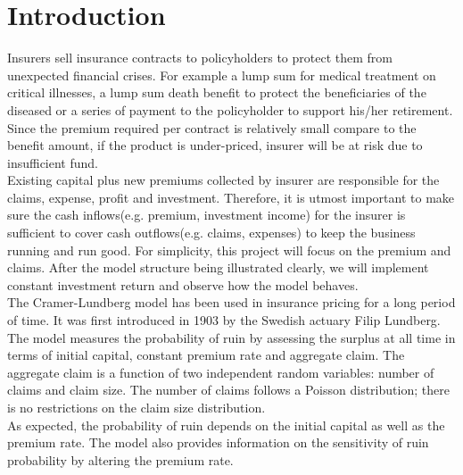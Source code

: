 \documentclass[12pt]{article}
\begin{document}
\newpage
\tableofcontents


\newpage
\section{Introduction}

\hspace{12.2mm}Insurers sell insurance contracts to policyholders to protect them from unexpected financial crises. For example a lump sum for medical treatment on critical illnesses, a lump sum death benefit to protect the beneficiaries of the diseased or a series of payment to the policyholder to support his/her retirement. Since the premium required per contract is relatively small compare to the benefit amount, if the product is under-priced, insurer will be at risk due to insufficient fund.\\

Existing capital plus new premiums collected by insurer are responsible for the claims, expense, profit and investment. Therefore, it is utmost important to make sure the cash inflows(e.g. premium, investment income) for the insurer is sufficient to cover cash outflows(e.g. claims, expenses) to keep the business running and run good. For simplicity, this project will focus on the premium and claims. After the model structure being illustrated clearly, we will implement constant investment return and observe how the model behaves.\\

The Cramer-Lundberg model \cite{ref01} has been used in insurance pricing for a long period of time. It was first introduced in 1903 by the Swedish actuary Filip Lundberg. The model measures the probability of ruin by assessing the surplus at all time in terms of initial capital, constant premium rate and aggregate claim. The aggregate claim is a function of two independent random variables: number of claims and claim size. The number of claims follows a Poisson distribution; there is no restrictions on the claim size distribution.\\

As expected, the probability of ruin depends on the initial capital as well as the premium rate. The model also provides information on the sensitivity of ruin probability by altering the premium rate.\\
\end{document}

